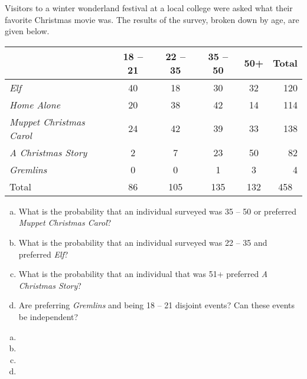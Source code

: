 \documentclass[12pt,letterpaper]{exam}
\begin{document}
\begin{questions}
\sol 



\newpage
\question[10] Visitors to a winter wonderland festival at a local college were asked what their favorite Christmas movie was. The results of the survey, broken down by age, are given below. \par
	\begin{table}[H]
	\centering
	\begin{tabular}{|l|cccc|r|} \hline
	 & 18 -- 21 & 22 -- 35 & 35 -- 50 & 50+ & \multicolumn{1}{c|}{Total} \\ \hline
	\textit{Elf} & 40 & 18 & 30 & 32 & 120 \\
	\textit{Home Alone} & 20 & 38 & 42 & 14 & 114 \\
	\textit{Muppet Christmas Carol} & 24 & 42 & 39 & 33 & 138 \\
	\textit{A Christmas Story} & 2 & 7 & 23 & 50 & 82 \\
	\textit{Gremlins} & 0 & 0 & 1 & 3 & 4 \\ \hline
	Total & 86 & 105 & 135 & 132 & \multicolumn{1}{c|}{458} \\ \hline
	\end{tabular}
	\end{table} \par

\begin{enumerate}[(a)]
\item What is the probability that an individual surveyed was 35 -- 50 or preferred \textit{Muppet Christmas Carol}?
\item What is the probability that an individual surveyed was 22 -- 35 and preferred \textit{Elf}?
\item What is the probability that an individual that was 51+ preferred \textit{A Christmas Story}?
\item Are preferring \textit{Gremlins} and being 18 -- 21 disjoint events? Can these events be independent? 
\end{enumerate} \pspace

\sol 
\begin{enumerate}[(a)]
\item 
\item 
\item 
\item 
\end{enumerate}


\end{questions}
\end{document}
